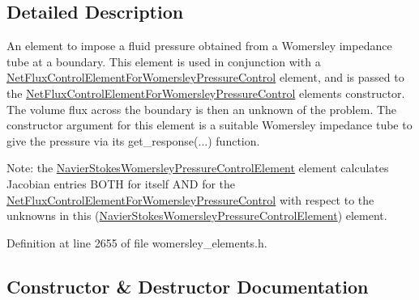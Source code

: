 \subsection{Detailed Description}
An element to impose a fluid pressure obtained from a Womersley impedance tube at a boundary. This element is used in conjunction with a \hyperlink{classoomph_1_1NetFluxControlElementForWomersleyPressureControl}{Net\+Flux\+Control\+Element\+For\+Womersley\+Pressure\+Control} element, and is passed to the \hyperlink{classoomph_1_1NetFluxControlElementForWomersleyPressureControl}{Net\+Flux\+Control\+Element\+For\+Womersley\+Pressure\+Control} element\textquotesingle{}s constructor. The volume flux across the boundary is then an unknown of the problem. The constructor argument for this element is a suitable Womersley impedance tube to give the pressure via its get\+\_\+response(...) function.

Note\+: the \hyperlink{classoomph_1_1NavierStokesWomersleyPressureControlElement}{Navier\+Stokes\+Womersley\+Pressure\+Control\+Element} element calculates Jacobian entries B\+O\+TH for itself A\+ND for the \hyperlink{classoomph_1_1NetFluxControlElementForWomersleyPressureControl}{Net\+Flux\+Control\+Element\+For\+Womersley\+Pressure\+Control} with respect to the unknowns in this (\hyperlink{classoomph_1_1NavierStokesWomersleyPressureControlElement}{Navier\+Stokes\+Womersley\+Pressure\+Control\+Element}) element. 

Definition at line 2655 of file womersley\+\_\+elements.\+h.



\subsection{Constructor \& Destructor Documentation}
\mbox{\label{classoomph_1_1NavierStokesWomersleyPressureControlElement_ad3293da10ac3a22cd70ae7c8c11980d9}} 
